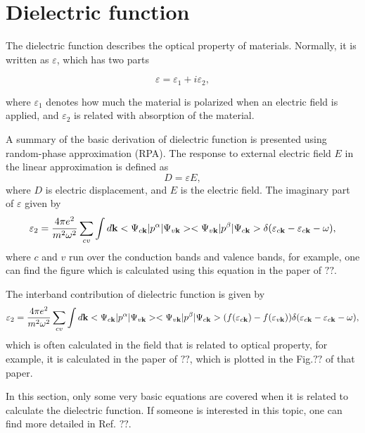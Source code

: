 \documentclass[a4paper, 12pt, titlepage,oneside,drop]{kthesis}
\begin{document}
\section{Dielectric function}
The dielectric function describes the optical property of materials. Normally, it is written as $\varepsilon$, which has two parts

\begin{equation}
 \varepsilon = \varepsilon_1 + i \varepsilon_2,
\end{equation}

where $\varepsilon_1$ denotes how much the material is polarized when an electric field is applied, and $\varepsilon_2$ is related with absorption of the material.

A summary of the basic derivation of dielectric function is presented using random-phase approximation (RPA). The response to external electric field $E$ in the linear approximation is defined as
\begin{equation}\label{df1}
D = \varepsilon E,
\end{equation}
where $D$ is electric displacement, and $E$ is the electric field. The imaginary part of $\varepsilon$ given by
\begin{equation}\label{df2}
\varepsilon_2 = \frac{4 \pi e^2}{m^2\omega^2} \sum_{cv} \int d \textbf {k} <\Psi_{c{\textbf k}}|p^\alpha|\Psi_{v{\textbf k}}><\Psi_{v{\textbf k}}|p^\beta|\Psi_{c{\textbf k}}>\delta(\varepsilon_{c {\textbf k}}-\varepsilon_{c{\textbf k}}-\omega),
\end{equation}
where $c$ and $v$ run over the conduction bands and valence bands, for example, one can find the figure which is calculated using this equation in the paper of $??$.

The interband contribution of dielectric function is given by
\begin{equation}\label{df2}
\varepsilon_2 = \frac{4 \pi e^2}{m^2\omega^2} \sum_{cv} \int d \textbf {k} <\Psi_{c{\textbf k}}|p^\alpha|\Psi_{v{\textbf k}}><\Psi_{v{\textbf k}}|p^\beta|\Psi_{c{\textbf k}}> (f(\varepsilon_{c \textbf k})-f(\varepsilon_{v \textbf k}))\delta(\varepsilon_{c {\textbf k}}-\varepsilon_{c{\textbf k}}-\omega),
\end{equation}
which is often calculated in the field that is related to optical property, for example, it is calculated in the paper of $??$, which is plotted in the Fig.$??$ of
that paper.

In this section, only some very basic equations are covered when it is related to calculate the dielectric function. If someone is interested in this topic, one can find more detailed in Ref. $??$.
\end{document}
